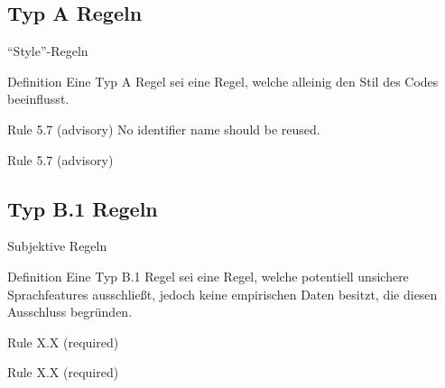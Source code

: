 \documentclass{beamer}
\begin{document}
    \subsection{Typ A Regeln}
    \label{subsec:typ-a-regeln}
    \begin{frame}{\enquote{Style}-Regeln}
         {
            \begin{block}{Definition}
                Eine Typ A Regel sei eine Regel, welche alleinig den Stil des Codes beeinflusst.
            \end{block}
            \pause
            \begin{exampleblock}{Rule 5.7 (advisory)}
                No identifier name should be reused.
            \end{exampleblock}
        }
         {
            \begin{exampleblock}{Rule 5.7 (advisory)}
                
            \end{exampleblock}
        }
    \end{frame}

    \subsection{Typ B.1 Regeln}
    \label{subsec:typ-b-1-regeln}
    \begin{frame}{Subjektive Regeln}
         {
            \begin{block}{Definition}
                Eine Typ B.1 Regel sei eine Regel, welche potentiell unsichere Sprachfeatures ausschließt,
                jedoch keine empirischen Daten besitzt, die diesen Ausschluss begründen.
            \end{block}
            \pause
            \begin{exampleblock}{Rule X.X (required)} %
            \end{exampleblock}
        }
         {
            \begin{exampleblock}{Rule X.X (required)} %
                
            \end{exampleblock}
        }
    \end{frame}
\end{document}
